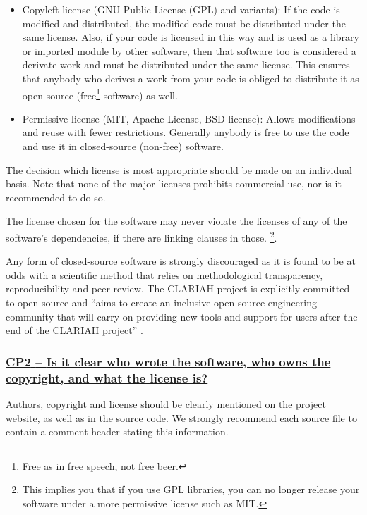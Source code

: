 \documentclass[a4paper,11pt]{article}
\newcommand{\criterion}[1]{\subsubsection*{\underline{#1}}}
\begin{document}
\begin{itemize}
 \item Copyleft license (GNU Public License (GPL) and variants): If the code is modified and distributed, the modified code must be distributed under the same license. Also, if your code is licensed in this way and is used as a library or imported module by other software, then that software too is considered a derivate work and must be distributed under the same license. This ensures that anybody who derives a work from your code is obliged to distribute it as open source (free\footnote{Free as in free speech, not free beer.} software) as well.
 \item Permissive license (MIT, Apache License, BSD license): Allows modifications and reuse with fewer restrictions. Generally anybody is free to use the code and use it in closed-source (non-free) software.
\end{itemize}

The decision which license is most appropriate should be made on an individual
basis. Note that none of the major licenses prohibits commercial use, nor is it
recommended to do so.

The license chosen for the software may never violate the licenses of any of
the software's dependencies, if there are linking clauses in those. \footnote{This implies you that if you use GPL libraries, you can no longer release your software under a more permissive license such as MIT.}.

Any form of closed-source software is strongly discouraged as it is found to be
at odds with a scientific method that relies on methodological transparency,
reproducibility and peer review. The CLARIAH project is explicitly committed to
open source and ``aims to create an inclusive open-source engineering community
that will carry on providing new tools and support for users after the end of
the CLARIAH project'' \citep{CLARIAHTECHPLAN1}.

\newcommand{\cpTwoID}{CP2}
\newcommand{\cpTwoText}{Is it clear who wrote the software, who owns the copyright, and what the license is?}
\criterion{\cpTwoID{ }--{ }\cpTwoText}\label{id:cp2} 

Authors, copyright and license should be clearly mentioned on the project
website, as well as in the source code.  We strongly recommend each source file to contain a comment header stating this information.
\end{document}
